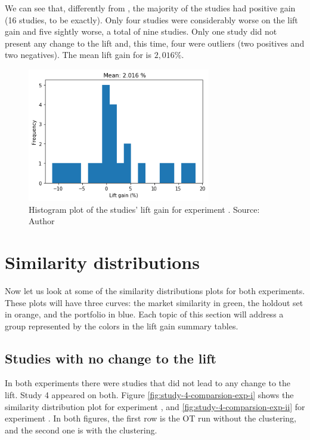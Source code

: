 We can see that, differently from \nameExperimentI{}, the majority of the studies had positive gain (16 studies, to be exactly). Only four studies were considerably worse on the lift gain and five sightly worse, a total of nine studies. Only one study did not present any change to the lift and, this time, four were outliers (two positives and two negatives). The mean lift gain for \nameExperimentII{} is $2,016 \%$.

\begin{figure}[!ht]
   \centering
   \includegraphics[width=8cm]{fig/ch4-lift-hist-plot-exp-ii.png}
   \caption{Histogram plot of the studies' lift gain for experiment \nameExperimentII{}. Source: Author}
   \label{fig:lift-hist-plot-exp-ii}
\end{figure}

\section{Similarity distributions}
\label{ch:simi-distis}

\newcommand{\simiDistWidth}{8cm}

Now let us look at some of the similarity distributions plots for both experiments. These plots will have three curves: the market similarity in green, the holdout set in orange, and the portfolio in blue. Each topic of this section will address a group represented by the colors in the lift gain summary tables. 

\subsection{Studies with no change to the lift}

In both experiments there were studies that did not lead to any change to the lift. Study 4 appeared on both. Figure \ref{fig:study-4-comparsion-exp-i} shows the similarity distribution plot for experiment \nameExperimentI{}, and \ref{fig:study-4-comparsion-exp-ii} for experiment \nameExperimentII{}. In both figures, the first row is the OT run without the clustering, and the second one is with the clustering. %

